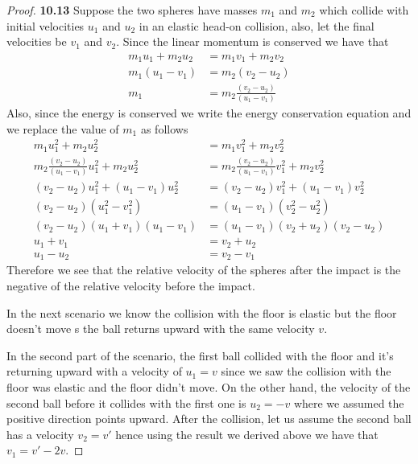 \documentclass[11pt]{article}
\theoremstyle{definition}
\begin{document}
\cleardoublepage
	\begin{proof}{\textbf{10.13}}
        Suppose the two spheres have masses $m_1$ and $m_2$ which collide with
        initial velocities $u_1$ and $u_2$ in an elastic head-on collision,
        also, let the final velocities be $v_1$ and $v_2$.
        Since the linear momentum is conserved we have that
        \begin{align*}
            m_1u_1 + m_2u_2 &= m_1v_1 + m_2v_2\\
            m_1(u_1 - v_1) &= m_2(v_2 - u_2)\\
            m_1 &= m_2\frac{(v_2 - u_2)}{(u_1 - v_1)}
        \end{align*} 
        Also, since the energy is conserved we write the energy conservation
        equation and we replace the value of $m_1$ as follows
        \begin{align*}
            m_1u_1^2 + m_2u_2^2 &= m_1v_1^2 + m_2v_2^2\\
            m_2\frac{(v_2 - u_2)}{(u_1 - v_1)}u_1^2 + m_2u_2^2 &=
            m_2\frac{(v_2 - u_2)}{(u_1 - v_1)}v_1^2 + m_2v_2^2\\
            (v_2 - u_2)u_1^2 + (u_1 - v_1)u_2^2 &=
            (v_2 - u_2)v_1^2 + (u_1 - v_1)v_2^2\\
            (v_2 - u_2)(u_1^2 -v_1^2) &=
            (u_1 - v_1)(v_2^2 - u_2^2)\\
            (v_2 - u_2)(u_1 + v_1)(u_1 - v_1) &=
            (u_1 - v_1)(v_2 + u_2)(v_2 - u_2)\\
            u_1 + v_1 &= v_2 + u_2\\
            u_1 - u_2 &= v_2 - v_1
        \end{align*}
        Therefore we see that the relative velocity of the spheres after
        the impact is the negative of the relative velocity before the impact. 

        In the next scenario we know the collision with the floor is
        elastic but the floor doesn't move s the ball returns
        upward with the same velocity $v$.

        In the second part of the scenario, the first ball collided with the
        floor and it's returning upward with a velocity of $u_1=v$ since
        we saw the collision with the floor was elastic and the floor didn't
        move. On the other hand, the velocity of the second ball before it
        collides with the first one is $u_2 = -v$ where we assumed the
        positive direction points upward.
        After the collision, let us assume the second ball has a velocity
        $v_2 = v'$ hence using the result we derived above we have that
        $v_1 = v'- 2v$.


\end{proof}
\end{document}
